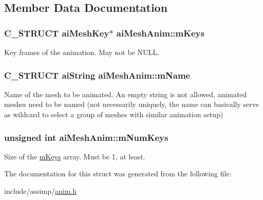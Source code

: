 \subsection{\-Member \-Data \-Documentation}
\hypertarget{structaiMeshAnim_abc78e9f6d7583c541447e8c389488f1b}{
\subsubsection[{m\-Keys}]{\setlength{\rightskip}{0pt plus 5cm}\-C\-\_\-\-S\-T\-R\-U\-C\-T {\bf ai\-Mesh\-Key}$\ast$ {\bf ai\-Mesh\-Anim\-::m\-Keys}}}\label{structaiMeshAnim_abc78e9f6d7583c541447e8c389488f1b}
\-Key frames of the animation. \-May not be \-N\-U\-L\-L. \hypertarget{structaiMeshAnim_a20751a739377fdba514c676ef4bda4c7}{
\subsubsection[{m\-Name}]{\setlength{\rightskip}{0pt plus 5cm}\-C\-\_\-\-S\-T\-R\-U\-C\-T {\bf ai\-String} {\bf ai\-Mesh\-Anim\-::m\-Name}}}\label{structaiMeshAnim_a20751a739377fdba514c676ef4bda4c7}
\-Name of the mesh to be animated. \-An empty string is not allowed, animated meshes need to be named (not necessarily uniquely, the name can basically serve as wildcard to select a group of meshes with similar animation setup) \hypertarget{structaiMeshAnim_aa8702d42bf619ccc8414a556f41634d8}{
\subsubsection[{m\-Num\-Keys}]{\setlength{\rightskip}{0pt plus 5cm}unsigned int {\bf ai\-Mesh\-Anim\-::m\-Num\-Keys}}}\label{structaiMeshAnim_aa8702d42bf619ccc8414a556f41634d8}
\-Size of the \hyperlink{structaiMeshAnim_abc78e9f6d7583c541447e8c389488f1b}{m\-Keys} array. \-Must be 1, at least. 

\-The documentation for this struct was generated from the following file\-:\begin{DoxyCompactItemize}
\item 
include/assimp/\hyperlink{anim_8h}{anim.\-h}\end{DoxyCompactItemize}
